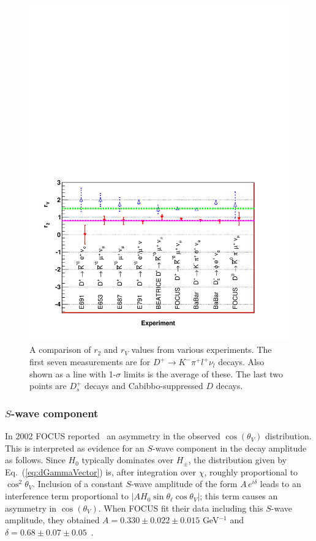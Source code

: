 \begin{figure}[htbp]
  \begin{center}
    \includegraphics[width=6in,bb=0 0 550 400,angle=0]{figures/charm/sl_r2rv_hfag.pdf}
  \end{center}
\vskip0.10in
  \caption{A comparison of $r_2$ and $r_V$ values 
    from various experiments. The first seven measurements are for $D^+
    \to K^-\pi^+ l^+\nu_l$ decays. Also shown as a line with
    1-$\sigma$ limits is the average of these. The last two points are
    $D_s^+$ decays and Cabibbo-suppressed $D$ decays. 
  \label{fig:r2rv}}
\end{figure}

\subsubsection{$S$-wave component}

In 2002 FOCUS reported~\cite{Link:2002ev} an asymmetry in
the observed $\cos(\theta_V)$ distribution. This is interpreted as
evidence for an $S$-wave component in the decay amplitude as follows. 
Since $H_0$ typically dominates over $H_{\pm}$, the distribution given 
by Eq.~(\ref{eq:dGammaVector}) is, after integration over $\chi$,
roughly proportional to $\cos^2\theta_V$. 
Inclusion of a constant $S$-wave amplitude of the form $A\,e^{i\delta}$ 
leads to an interference term proportional to 
$|A H_0 \sin\theta_\ell \cos\theta_V|$; this term causes an asymmetry 
in $\cos(\theta_V)$.
When FOCUS fit their data including this $S$-wave amplitude, 
they obtained $A = 0.330 \pm 0.022 \pm 0.015$ GeV$^{-1}$ and 
$\delta = 0.68 \pm 0.07 \pm 0.05$~\cite{Link:2002wg}. 

